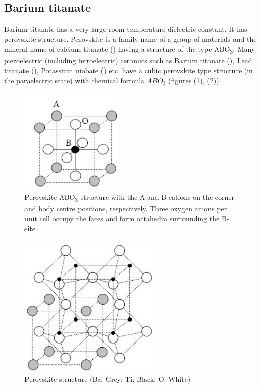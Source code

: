 \documentclass[%
 aip,
 amsmath,amssymb,
 reprint, floatfix%
]{revtex4-1}
\begin{document}
    \subsection{Barium titanate}
    Barium titanate has a very large room temperature dielectric constant. It has perovskite structure. Perovskite is a family name of a group of materials and the mineral name of calcium titanate () having a structure of the type ABO\textsubscript{3}. Many piezoelectric (including ferroelectric) ceramics such as Barium titanate (), Lead titanate (), Potassium niobate () etc. have a cubic perovskite type structure (in the paraelectric state) with chemical formula $ABO_3$ (figures (\ref{fig:pero1}), (\ref{fig:pero2})).
    \begin{figure}
        \centering
        \includegraphics{Figures/abo3.png}
        \caption{Perovskite ABO\textsubscript{3} structure with the A and B cations on the corner and body centre positions, respectively. Three oxygen anions per unit cell occupy the faces and form octahedra surrounding the B-site.}
        \label{fig:pero1}
    \end{figure}
    \begin{figure}
        \centering
        \includegraphics{Figures/batio3.png}
        \caption{Perovskite structure (Ba: Grey; Ti: Black; O: White)}
        \label{fig:pero2}
    \end{figure}
\end{document}
